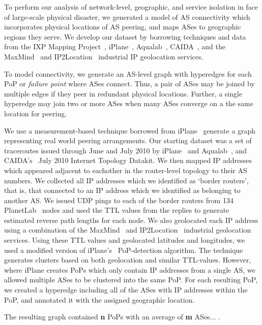     To perform our analysis of network-level, geographic, and service isolation in face of large-scale physical disaster, we generated a model of AS connectivity which incorporates physical locations of AS peering, and maps ASes to geographic regions they serve. 
    We develop our dataset by borrowing techniques and data from
    the IXP
    Mapping Project~\cite{ixps-mapped}, iPlane~\cite{iplane},
    Aqualab~\cite{sidewalk},
    CAIDA~\cite{caidadata}, and the MaxMind~\cite{maxmind} and
IP2Location~\cite{ip2loc} industrial IP geolocation services.

    To model connectivity, we generate an AS-level graph with hyperedges for
each PoP or {\it failure point} where ASes connect.
    Thus, a pair of ASes may be joined by multiple edges if they peer in
redundant physical locations.
    Further, a single hyperedge may join two or more ASes when many ASes
converge on a the same location for peering.
    
    We use a measurement-based technique borrowed from iPlane~\cite{iplane}
generate a graph representing real world peering arrangements.  
    Our starting dataset was a set of traceroutes issued through June and July 2010 by
iPlane~\cite{iplane} and Aqualab~\cite{aqualab}, and CAIDA's~\cite{caida} July
2010 Internet Topology Datakit.
    We then mapped IP addresses which appeared adjacent to eachother in the
router-level topology to their AS numbers. 
    We collected all IP addresses which we identified as `border routers', that
is, that connected to an IP address which we identified as belonging to another
AS.
    We issued UDP pings to each of the border routers from 134
PlanetLab~\cite{planetlab} nodes and used the TTL values from the replies to
generate estimated reverse path lengths for each node. 
    We also geolocated each IP address using a combination of the
MaxMind~\cite{maxmind} and IP2Location~\cite{ip2loc} industrial geolocation
services.
    Using these TTL values and geolocated latitudes and longitudes, we used
a modified version of iPlane's~\cite{iplane} PoP-detection algorithm.
    The technique generates clusters based on both geolocation and similar
TTL-values. 
    However, where iPlane creates PoPs which only contain IP addresses from a
single AS, we allowed multiple ASes to be clustered into the same PoP. 
    For each resulting PoP, we created a hyperedge including all of the ASes
with IP addresses within the PoP, and annotated it with the assigned geographic
location.

    The resulting graph contained {\bf n} PoPs with an average of {\bf m}
ASes... . 

